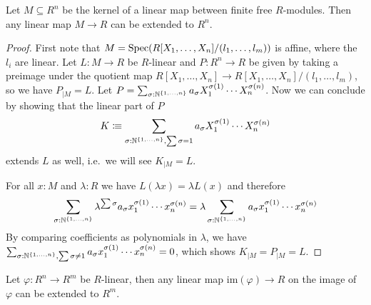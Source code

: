 \begin{lemma}
  \label{extend-from-kernel}
  Let $M\subseteq R^n$ be the kernel of a linear map between finite free $R$-modules.
  Then any linear map $M\to R$ can be extended to $R^n$.
\end{lemma}

\begin{proof}
  First note that $M=\operatorname{Spec}(R[X_1,\dots,X_n]/(l_1,\dots,l_m))$ is affine, where the $l_i$ are linear.
  Let $L:M\to R$ be $R$-linear and $P:R^n\to R$ be given by taking a preimage under the quotient map $R[X_1,\dots,X_n]\to R[X_1,\dots,X_n]/(l_1,\dots,l_m)$,
  so we have $P_{\vert M}=L$.
  Let $P=\sum_{\sigma:\mathbb{N}^{\{1,\dots,n\}}}a_\sigma X_1^{\sigma(1)}\cdots X_n^{\sigma(n)}$.
  Now we can conclude by showing that the linear part of $P$
  \[
    K\vcentcolon\mspace{-1.2mu}\equiv \sum_{\sigma:\mathbb{N}^{\{1,\dots,n\}}, \sum \sigma =1}a_\sigma X_1^{\sigma(1)}\cdots X_n^{\sigma(n)}
  \]
  extends $L$ as well, i.e.\ we will see $K_{\vert M}=L$.
  
  For all $x:M$ and $\lambda : R$ we have $L(\lambda x)=\lambda L(x)$ and therefore
  \[
    \sum_{\sigma:\mathbb{N}^{\{1,\dots,n\}}}\lambda^{\sum\sigma} a_\sigma x_1^{\sigma(1)}\cdots x_n^{\sigma(n)}=\lambda \sum_{\sigma:\mathbb{N}^{\{1,\dots,n\}}} a_\sigma x_1^{\sigma(1)}\cdots x_n^{\sigma(n)}
  \]
  By comparing coefficients as polynomials in $\lambda$, we have $\sum_{\sigma:\mathbb{N}^{\{1,\dots,n\}}, \sum \sigma \neq 1}a_\sigma x_1^{\sigma(1)}\cdots x_n^{\sigma(n)}=0$,
  which shows $K_{\vert M}=P_{\vert M}=L$.
\end{proof}

\begin{lemma}
  \label{extend-from-image}
  Let $\varphi:R^n\to R^m$ be $R$-linear, then any linear map $\mathrm{im}(\varphi)\to R$ on the image of $\varphi$ can be extended to $R^m$.
\end{lemma}

